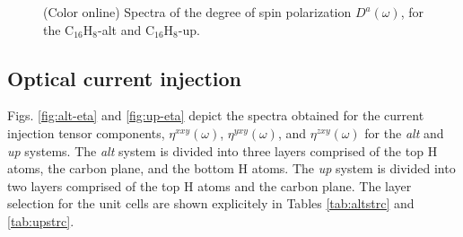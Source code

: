 \documentclass[pss]{wiley2sp} %
\begin{document}
\begin{figure}[t]
\hfill
{}
\caption{(Color online) Spectra of the degree of spin polarization
{$D^{a}(\omega)$}, for the C$_{16}$H$_{8}$-alt and
C$_{16}$H$_{8}$-up.\label{fig:Da}}
\end{figure}


\subsection{Optical current injection}\label{subsec:results-eta}

Figs. \ref{fig:alt-eta} and \ref{fig:up-eta} depict the spectra obtained for
the current injection tensor components, $\eta^{xxy}(\omega)$,
$\eta^{yxy}(\omega)$, and $\eta^{zxy}(\omega)$ for the
\emph{alt} and \emph{up} systems. The \emph{alt} system is divided into three
layers comprised of the top H atoms, the carbon plane, and the bottom H atoms.
The \emph{up} system is divided into two layers comprised of the top H atoms
and the carbon plane. The layer selection for the unit cells are shown
explicitely in Tables \ref{tab:altstrc} and \ref{tab:upstrc}.
\end{document}
